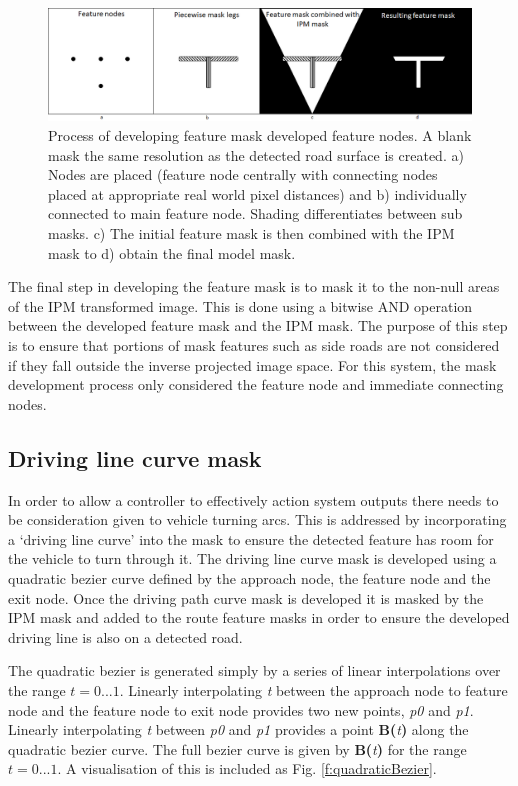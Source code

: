 \documentclass[]{aiaa-tc}%
\begin{document}
\begin{figure}
	\centering
	\includegraphics[width=1\textwidth]{FeatureMatching/featureMaskDevelopment.png}
	\caption{Process of developing feature mask developed feature nodes. A blank mask the same resolution as the detected road surface is created. a) Nodes are placed (feature node centrally with connecting nodes placed at appropriate real world pixel distances) and b) individually connected to main feature node. Shading differentiates between sub masks. c) The initial feature mask is then combined with the IPM mask to d) obtain the final model mask.}
	\label{f:featureMaskDevelopment}
\end{figure}


The final step in developing the feature mask is to mask it to the non-null areas of the IPM transformed image. This is done using a bitwise AND operation between the developed feature mask and the IPM mask. The purpose of this step is to ensure that portions of mask features such as side roads are not considered if they fall outside the inverse projected image space. For this system, the mask development process only considered the feature node and immediate connecting nodes. 


\subsection{Driving line curve mask} \label{s:drivingPathMatching}

In order to allow a controller to effectively action system outputs there needs to be consideration given to vehicle turning arcs. This is addressed by incorporating a `driving line curve' into the mask to ensure the detected feature has room for the vehicle to turn through it. The driving line curve mask is developed using a quadratic bezier curve defined by the approach node, the feature node and the exit node. Once the driving path curve mask is developed it is masked by the IPM mask and added to the route feature masks in order to ensure the developed driving line is also on a detected road. 

The quadratic bezier is generated simply by a series of linear interpolations over the range $t=0...1$. Linearly interpolating \textit{t} between the approach node to feature node and the feature node to exit node provides two new points, \textit{p0} and \textit{p1}. Linearly interpolating \textit{t} between \textit{p0} and \textit{p1} provides a point \textbf{B(}\textit{t}\textbf{)} along the quadratic bezier curve. The full bezier curve is given by \textbf{B(}\textit{t}\textbf{)} for the range $t=0...1$. A visualisation of this is included as Fig. \ref{f:quadraticBezier}.
\end{document}
